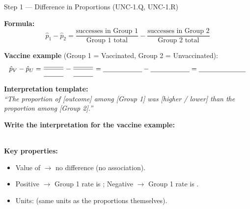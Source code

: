\documentclass[10pt]{article}
\begin{document}
\vspace{0.1in}

\begin{notesbox}{Step 1 --- Difference in Proportions (UNC-1.Q, UNC-1.R)}
\small

\noindent\textbf{Formula:}
\[
  \hat{p}_1 - \hat{p}_2 = \frac{\text{successes in Group 1}}{\text{Group 1 total}} -
                           \frac{\text{successes in Group 2}}{\text{Group 2 total}}
\]

\vspace{4pt}
\textbf{Vaccine example} (Group 1 = Vaccinated, Group 2 = Unvaccinated):
\[
  \hat{p}_V - \hat{p}_U = \frac{\blank{1cm}}{\blank{1cm}} - \frac{\blank{1cm}}{\blank{1cm}}
  = \blank{2cm} - \blank{2cm} = \blank{2.4cm}
\]

\vspace{6pt}
\textbf{Interpretation template:}\\
\textit{``The proportion of [outcome] among [Group 1] was \underline{\hspace{2cm}} [higher / lower]
than the proportion among [Group 2].''}

\vspace{6pt}
\textbf{Write the interpretation for the vaccine example:}\\[6pt]
\writeline\\[1pt]\writeline

\vspace{6pt}
\textbf{Key properties:}
\begin{itemize}[leftmargin=1.5em, itemsep=2pt]
  \item Value of \blank{1cm} $\to$ no difference (no association).
  \item Positive $\to$ Group 1 rate is \blank{3cm}; Negative $\to$ Group 1 rate is \blank{3cm}.
  \item Units: \blank{3cm} (same units as the proportions themselves).
\end{itemize}
\end{notesbox}

\vspace{0.1in}
\end{document}

